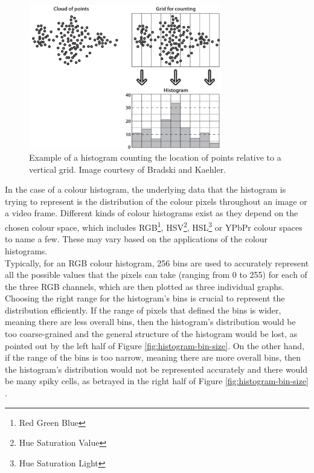 \begin{figure}[h]
\centerline{\includegraphics[width=0.75\textwidth]{figures/histogram_general_example.png}}
\caption{\label{fig:histogram-general-example}Example of a histogram counting the location of points relative to a vertical grid. Image courtesy of Bradski and Kaehler.}
\end{figure}

In the case of a colour histogram, the underlying data that the histogram is trying to represent is the distribution of the colour pixels throughout an image or a video frame. Different kinds of colour histograms exist as they depend on the chosen colour space, which includes RGB\footnote{Red Green Blue}, HSV\footnote{Hue Saturation Value}, HSL\footnote{Hue Saturation Light} or YPbPr colour spaces to name a few. These may vary based on the applications of the colour histograms.\\

Typically, for an RGB colour histogram, 256 bins are used to accurately represent all the possible values that the pixels can take (ranging from 0 to 255) for each of the three RGB channels, which are then plotted as three individual graphs. Choosing the right range for the histogram's bins is crucial to represent the distribution efficiently. If the range of pixels that defined the bins is wider, meaning there are less overall bins, then the histogram's distribution would be too coarse-grained and the general structure of the histogram would be lost, as pointed out by the left half of Figure \ref{fig:histogram-bin-size}. On the other hand, if the range of the bins is too narrow, meaning there are more overall bins, then the histogram's distribution would not be represented accurately and there would be many spiky cells, as betrayed in the right half of Figure \ref{fig:histogram-bin-size} \cite{bradski2008opencv}.

